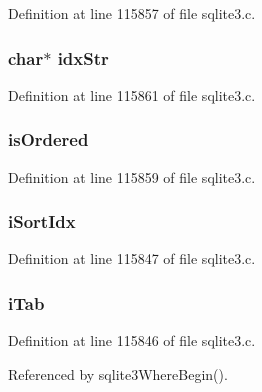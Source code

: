 Definition at line 115857 of file sqlite3.\+c.

\hypertarget{struct_where_loop_ad3aa8f088bcb7185aecac4ee06eae981}{}
\subsubsection[{idx\+Str}]{\setlength{\rightskip}{0pt plus 5cm}char$\ast$ idx\+Str}\label{struct_where_loop_ad3aa8f088bcb7185aecac4ee06eae981}


Definition at line 115861 of file sqlite3.\+c.

\hypertarget{struct_where_loop_af9174dc8e7056e94c539611eeb036d8d}{}
\subsubsection[{is\+Ordered}]{ is\+Ordered}\label{struct_where_loop_af9174dc8e7056e94c539611eeb036d8d}


Definition at line 115859 of file sqlite3.\+c.

\hypertarget{struct_where_loop_a97de1d9f0de4b544e2eb6cd2b01dd026}{}
\subsubsection[{i\+Sort\+Idx}]{ i\+Sort\+Idx}\label{struct_where_loop_a97de1d9f0de4b544e2eb6cd2b01dd026}


Definition at line 115847 of file sqlite3.\+c.

\hypertarget{struct_where_loop_a41a4c5b9a04bd1b37b6509a0be68fb8c}{}
\subsubsection[{i\+Tab}]{ i\+Tab}\label{struct_where_loop_a41a4c5b9a04bd1b37b6509a0be68fb8c}


Definition at line 115846 of file sqlite3.\+c.



Referenced by sqlite3\+Where\+Begin().

